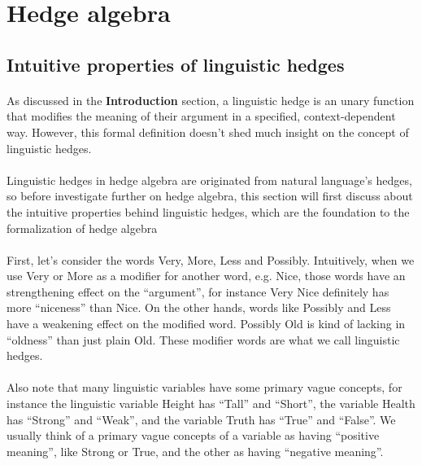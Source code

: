 \documentclass[part1.tex]{subfiles}
\begin{document}
\section{Hedge algebra}
\subsection{Intuitive properties of linguistic hedges}
\paragraph{} As discussed in the {\bfseries Introduction}
section, a linguistic hedge is an unary function that modifies
the meaning of their argument in a specified, context-dependent
way. However, this formal definition doesn't shed much insight on
the concept of linguistic hedges.
\paragraph{} Linguistic hedges in hedge algebra are originated
from natural language's hedges, so before investigate further on
hedge algebra, this section will first discuss about the
intuitive properties behind linguistic hedges, which are the
foundation to the formalization of hedge algebra
\paragraph{} First, let's consider the words Very, More, Less
and Possibly. Intuitively, when we use Very or More
as a modifier for another word, e.g. Nice, those words have an
strengthening effect on the ``argument'', for instance Very Nice
definitely has more ``niceness'' than Nice. On the other hands,
words like Possibly and Less have a weakening
effect on the modified word. Possibly Old is kind of lacking in
``oldness'' than just plain Old. These modifier words are what we
call linguistic hedges.
\paragraph{} Also note that many linguistic variables have some
primary vague concepts, for instance the linguistic variable
Height has ``Tall'' and ``Short'', the variable Health has
``Strong'' and ``Weak'', and the variable Truth has ``True'' and
``False''. We usually think of a primary vague concepts of a
variable as having ``positive meaning'', like Strong or True, and the other
as having ``negative meaning''.
\end{document}
